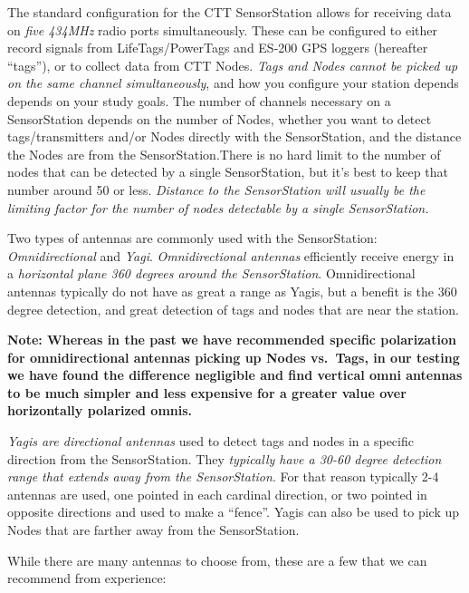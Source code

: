 \documentclass[
]{article}
\begin{document}
The standard configuration for the CTT SensorStation allows for
receiving data on \emph{five 434MHz} radio ports simultaneously. These
can be configured to either record signals from LifeTags/PowerTags and
ES-200 GPS loggers (hereafter ``tags''), or to collect data from CTT
Nodes. \emph{Tags and Nodes cannot be picked up on the same channel
simultaneously}, and how you configure your station depends depends on
your study goals. The number of channels necessary on a SensorStation
depends on the number of Nodes, whether you want to detect
tags/transmitters and/or Nodes directly with the SensorStation, and the
distance the Nodes are from the SensorStation.There is no hard limit to
the number of nodes that can be detected by a single SensorStation, but
it's best to keep that number around 50 or less. \emph{Distance to the
SensorStation will usually be the limiting factor for the number of
nodes detectable by a single SensorStation.}

Two types of antennas are commonly used with the SensorStation:
\emph{Omnidirectional} and \emph{Yagi}. \emph{Omnidirectional antennas}
efficiently receive energy in a \emph{horizontal plane 360 degrees
around the SensorStation}. Omnidirectional antennas typically do not
have as great a range as Yagis, but a benefit is the 360 degree
detection, and great detection of tags and nodes that are near the
station.

\textbf{Note: Whereas in the past we have recommended specific
polarization for omnidirectional antennas picking up Nodes vs.~Tags, in
our testing we have found the difference negligible and find vertical
omni antennas to be much simpler and less expensive for a greater value
over horizontally polarized omnis.}

\emph{Yagis are directional antennas} used to detect tags and nodes in a
specific direction from the SensorStation. They \emph{typically have a
30-60 degree detection range that extends away from the SensorStation}.
For that reason typically 2-4 antennas are used, one pointed in each
cardinal direction, or two pointed in opposite directions and used to
make a ``fence''. Yagis can also be used to pick up Nodes that are
farther away from the SensorStation.

While there are many antennas to choose from, these are a few that we
can recommend from experience:
\end{document}
